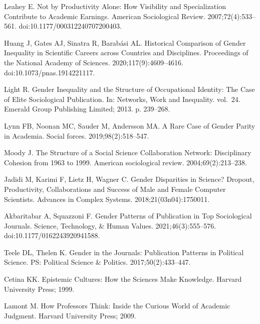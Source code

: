 \documentclass[
  10pt,
  letterpaper,
]{article}
\begin{document}
\begin{thebibliography}{10}
Leahey E.
\newblock Not by {{Productivity Alone}}: {{How Visibility}} and {{Specialization Contribute}} to {{Academic Earnings}}.
\newblock American Sociological Review. 2007;72(4):533--561.
\newblock doi:{10.1177/000312240707200403}.

Huang J, Gates AJ, Sinatra R, Barab{\'a}si AL.
\newblock Historical Comparison of Gender Inequality in Scientific Careers across Countries and Disciplines.
\newblock Proceedings of the National Academy of Sciences. 2020;117(9):4609--4616.
\newblock doi:{10.1073/pnas.1914221117}.

Light R.
\newblock Gender Inequality and the Structure of Occupational Identity: {{The}} Case of Elite Sociological Publication.
\newblock In: Networks, Work and Inequality. vol.~24. Emerald Group Publishing Limited; 2013. p. 239--268.

Lynn FB, Noonan MC, Sauder M, Andersson MA.
\newblock A Rare Case of Gender Parity in Academia.
\newblock Social forces. 2019;98(2):518--547.

Moody J.
\newblock The Structure of a Social Science Collaboration Network: {{Disciplinary}} Cohesion from 1963 to 1999.
\newblock American sociological review. 2004;69(2):213--238.

Jadidi M, Karimi F, Lietz H, Wagner C.
\newblock Gender Disparities in Science? {{Dropout}}, Productivity, Collaborations and Success of Male and Female Computer Scientists.
\newblock Advances in Complex Systems. 2018;21(03n04):1750011.

Akbaritabar A, Squazzoni F.
\newblock Gender {{Patterns}} of {{Publication}} in {{Top Sociological Journals}}.
\newblock Science, Technology, \& Human Values. 2021;46(3):555--576.
\newblock doi:{10.1177/0162243920941588}.

Teele DL, Thelen K.
\newblock Gender in the Journals: {{Publication}} Patterns in Political Science.
\newblock PS: Political Science \& Politics. 2017;50(2):433--447.

Cetina KK.
\newblock Epistemic {{Cultures}}: {{How}} the {{Sciences Make Knowledge}}.
\newblock Harvard University Press; 1999.

Lamont M.
\newblock How {{Professors Think}}: {{Inside}} the {{Curious World}} of {{Academic Judgment}}.
\newblock Harvard University Press; 2009.


\end{thebibliography}
\end{document}
